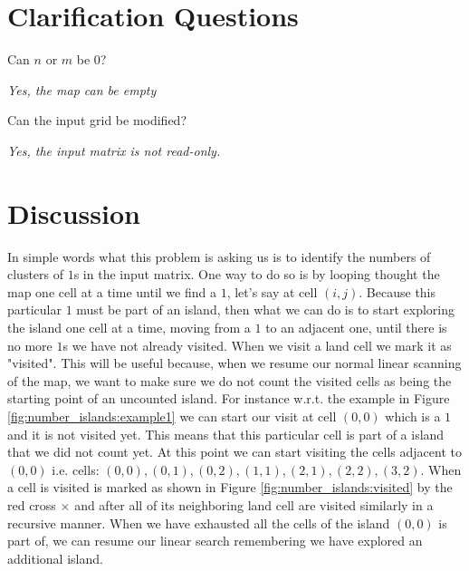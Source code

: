 \section{Clarification Questions}

\begin{QandA}
	\item \begin{questionitem} \begin{question} Can $n$ or $m$ be $0$?  \end{question} 	 
    \begin{answered}
		\textit{Yes, the map can be empty}
	\end{answered} \end{questionitem}
	\item \begin{questionitem} \begin{question} Can the input grid be modified?  \end{question} 	 
    \begin{answered}
		\textit{Yes, the input matrix is not read-only.}
	\end{answered} \end{questionitem}
\end{QandA}

\section{Discussion}
\label{number_islands:sec:discussion}
In simple words what this problem is asking us is  to identify the numbers of  clusters of $1$s in the input matrix.
One way to do so is by looping thought the map one cell at a time until we find a $1$, let's say at cell $(i,j)$.
Because this particular $1$ must be part of an island, then what we can do is to start exploring the island
one cell at a time, moving from a $1$ to an adjacent one, until there is no more $1$s we have not already visited.
When we visit a land cell we mark it as "visited".
This will be useful because, when we resume our normal linear scanning of the map, we want to make
sure we do not count the visited cells as being the starting point of an uncounted island.
For instance w.r.t. the example in Figure \ref{fig:number_islands:example1} we can start our visit
at cell $(0,0)$ which is a $1$ and it is not visited yet. This means that this particular cell is
part of a island that we did not count yet. At this point we can start visiting the cells adjacent
to $(0,0)$ i.e. cells: $(0,0), (0,1), (0,2), (1,1), (2,1), (2,2), (3,2)$. When a cell is visited is
marked as shown in Figure  \ref{fig:number_islands:visited} by the red cross
\textcolor[HTML]{860000}{$\times$} and after all of its neighboring land cell are visited similarly in a recursive manner.
When we have exhausted all the cells of the island $(0,0)$ is part of, we can resume our linear search remembering we have explored an additional island.

